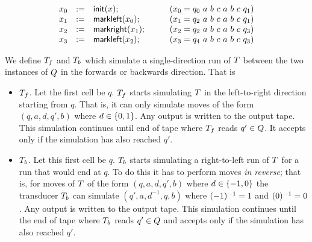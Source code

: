 %
\[
\begin{array}{rcll}
x_0 &:=& \mathsf{init}(x);
& \qquad (x_0 = q_0\ a\ b\ c\ a\ b\ c\ q_1) \\
x_1 &:=& \mathsf{markleft}(x_0);
& \qquad (x_1 = q_2\ a\ b\ c\ a\ b\ c\ q_1) \\
x_2 &:=& \mathsf{markright}(x_1);
& \qquad (x_2 = q_2\ a\ b\ c\ a\ b\ c\ q_3) \\
x_3 &:=& \mathsf{markleft}(x_2);
& \qquad (x_3 = q_4\ a\ b\ c\ a\ b\ c\ q_3) \\
\end{array}
\]

We define $T_f$ and $T_b$ which simulate a
single-direction run of $T$ between the two instances of $Q$
in the forwards or backwards direction.
%
That is
\begin{itemize}
	\item
	$T_f$.  %
	Let the first cell be $q$.
	$T_f$ starts simulating $T$ in the left-to-right direction
	starting from $q$.
	That is, it can only simulate moves of the form
	$(q, a, d, q', b)$
	where
	$d \in \{0, 1\}$.
	Any output is written to the output tape.
	This simulation continues until end of tape where $T_f$ reads  
	$q' \in Q$.
	It accepts only if the simulation has also reached $q'$.
	
	\item
	$T_b$. %
	Let this first cell be $q$.
    $T_b$  starts simulating a right-to-left run of $T$ for a run
	that would end at $q$.
	To do this it has to perform moves \emph{in reverse};
	that is, for moves of $T$ of the form
	$(q, a, d, q', b)$
	where
	$d \in \{-1, 0\}$
	the transducer $T_b$ can simulate
	$(q', a, d^{-1}, q, b)$
	where
	$(-1)^{-1} = 1$
	and
	$(0)^{-1} = 0$.
	Any output is written to the output tape.
	This simulation continues until the end of tape where $T_b$ reads 
	$q' \in Q$
	and accepts only if the simulation has also reached $q'$.
\end{itemize}

